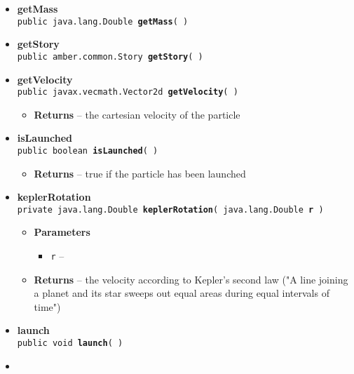 {{{\begin{itemize}
{}%
 \item{ 
{\bf getMass}\\
{\tt public java.lang.Double\ {\bf getMass}(  )
\label{amber.showoff.Particle.getMass()}}%
}%
 \item{ 
{\bf getStory}\\
{\tt public amber.common.Story\ {\bf getStory}(  )
\label{amber.showoff.Particle.getStory()}}%
}%
 \item{ 
{\bf getVelocity}\\
{\tt public javax.vecmath.Vector2d\ {\bf getVelocity}(  )
\label{amber.showoff.Particle.getVelocity()}}%
\begin{itemize}
\item{{\bf Returns} -- 
the cartesian velocity of the particle 
}%
\end{itemize}
}%
 \item{ 
{\bf isLaunched}\\
{\tt public boolean\ {\bf isLaunched}(  )
\label{amber.showoff.Particle.isLaunched()}}%
\begin{itemize}
\item{{\bf Returns} -- 
true if the particle has been launched 
}%
\end{itemize}
}%
 \item{ 
{\bf keplerRotation}\\
{\tt private java.lang.Double\ {\bf keplerRotation}( {\tt java.lang.Double} {\bf r} )
\label{amber.showoff.Particle.keplerRotation(java.lang.Double)}}%
\begin{itemize}
\item{
{\bf Parameters}
  \begin{itemize}
   \item{
{\tt r} -- }
  \end{itemize}
}%
\item{{\bf Returns} -- 
the velocity according to Kepler's second law ("A line joining a planet and its star sweeps out equal areas during equal intervals of time") 
}%
\end{itemize}
}%
 \item{ 
{\bf launch}\\
{\tt public void\ {\bf launch}(  )
\label{amber.showoff.Particle.launch()}}%
}%
 \item{ 
}
\end{itemize}}}}
